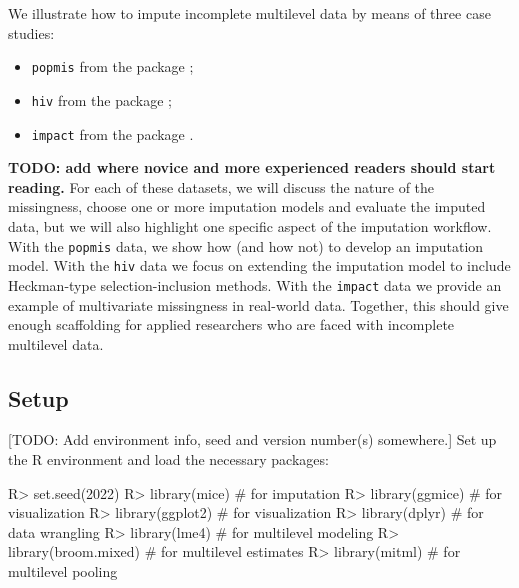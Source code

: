 \documentclass[
]{jss}
\providecommand{\tightlist}{%
  \setlength{\itemsep}{0pt}\setlength{\parskip}{0pt}}
\begin{document}
We illustrate how to impute incomplete multilevel data by means of three
case studies:

\begin{itemize}
\tightlist
\item
  \texttt{popmis} from the  package \citep[simulated data on
  perceived popularity, \(n = 2,000\) pupils across \(N = 100\)
  schools,][]{mice};
\item
  \texttt{hiv} from the  package \citep[simulated data on HIV
  diagnoses, \(n = 6,416\) patients across \(N = 9\) regions,][]{GJRM};
\item
  \texttt{impact} from the  package \citep[empirical data
  on traumatic brain injuries, \(n = 11,022\) patients across \(N = 15\)
  studies,][]{metamisc}.
\end{itemize}

\textbf{TODO: add where novice and more experienced readers should start
reading.} For each of these datasets, we will discuss the nature of the
missingness, choose one or more imputation models and evaluate the
imputed data, but we will also highlight one specific aspect of the
imputation workflow. With the \texttt{popmis} data, we show how (and how
not) to develop an imputation model. With the \texttt{hiv} data we focus
on extending the imputation model to include Heckman-type
selection-inclusion methods. With the \texttt{impact} data we provide an
example of multivariate missingness in real-world data. Together, this
should give enough scaffolding for applied researchers who are faced
with incomplete multilevel data.

\hypertarget{setup}{%
\subsection{Setup}\label{setup}}

{[}TODO: Add environment info, seed and version number(s) somewhere.{]}
Set up the R environment and load the necessary packages:

\begin{CodeChunk}
\begin{CodeInput}
R> set.seed(2022)
R> library(mice)         # for imputation
R> library(ggmice)       # for visualization
R> library(ggplot2)      # for visualization
R> library(dplyr)        # for data wrangling
R> library(lme4)         # for multilevel modeling
R> library(broom.mixed)  # for multilevel estimates
R> library(mitml)        # for multilevel pooling
\end{CodeInput}
\end{CodeChunk}
\end{document}
